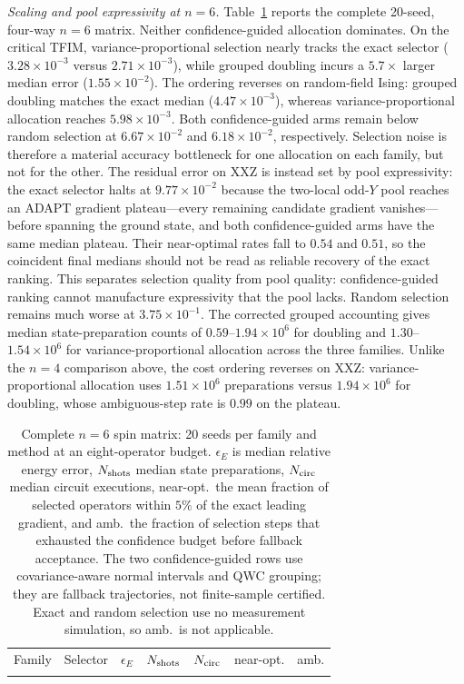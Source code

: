 \documentclass[aps,pra,reprint,superscriptaddress,nofootinbib,floatfix]{revtex4-2}
\begin{document}
\emph{Scaling and pool expressivity at $n=6$.} Table~\ref{tab:n6} reports the complete 20-seed, four-way $n=6$ matrix. Neither confidence-guided allocation dominates. On the critical TFIM, variance-proportional selection nearly tracks the exact selector ($3.28\times10^{-3}$ versus $2.71\times10^{-3}$), while grouped doubling incurs a $5.7\times$ larger median error ($1.55\times10^{-2}$). The ordering reverses on random-field Ising: grouped doubling matches the exact median ($4.47\times10^{-3}$), whereas variance-proportional allocation reaches $5.98\times10^{-3}$. Both confidence-guided arms remain below random selection at $6.67\times10^{-2}$ and $6.18\times10^{-2}$, respectively. Selection noise is therefore a material accuracy bottleneck for one allocation on each family, but not for the other. The residual error on XXZ is instead set by pool expressivity: the exact selector halts at $9.77\times10^{-2}$ because the two-local odd-$Y$ pool reaches an ADAPT gradient plateau---every remaining candidate gradient vanishes---before spanning the ground state, and both confidence-guided arms have the same median plateau. Their near-optimal rates fall to $0.54$ and $0.51$, so the coincident final medians should not be read as reliable recovery of the exact ranking. This separates selection quality from pool quality: confidence-guided ranking cannot manufacture expressivity that the pool lacks. Random selection remains much worse at $3.75\times10^{-1}$. The corrected grouped accounting gives median state-preparation counts of $0.59$--$1.94\times10^6$ for doubling and $1.30$--$1.54\times10^6$ for variance-proportional allocation across the three families. Unlike the $n=4$ comparison above, the cost ordering reverses on XXZ: variance-proportional allocation uses $1.51\times10^6$ preparations versus $1.94\times10^6$ for doubling, whose ambiguous-step rate is $0.99$ on the plateau.

\begin{table}[t]
\caption{Complete $n=6$ spin matrix: 20 seeds per family and method at an eight-operator budget. $\epsilon_E$ is median relative energy error, $N_{\rm shots}$ median state preparations, $N_{\rm circ}$ median circuit executions, near-opt.\ the mean fraction of selected operators within $5\%$ of the exact leading gradient, and amb.\ the fraction of selection steps that exhausted the confidence budget before fallback acceptance. The two confidence-guided rows use covariance-aware normal intervals and QWC grouping; they are fallback trajectories, not finite-sample certified. Exact and random selection use no measurement simulation, so amb.\ is not applicable.}
\label{tab:n6}
\centering
\footnotesize
\begin{ruledtabular}
\begin{tabular}{llcrrcc}
Family & Selector & $\epsilon_E$ & $N_{\rm shots}$ & $N_{\rm circ}$ & near-opt. & amb.\\
\colrule

\end{tabular}
\end{ruledtabular}
\end{table}
\end{document}
